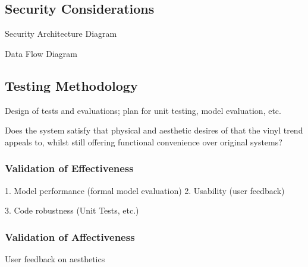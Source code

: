         \subsection{Security Considerations} \label{sec:security}
    
            \begin{temp}
                Security Architecture Diagram
            \end{temp}
    
            \begin{temp}
                Data Flow Diagram
            \end{temp}
        
        \subsection{Testing Methodology}
    
            \begin{temp}
                Design of tests and evaluations; plan for unit testing, model evaluation, etc.
                
                Does the system satisfy that physical and aesthetic desires of that the vinyl trend appeals to, whilst still offering functional convenience over original systems?
            \end{temp}
            
            \subsubsection{Validation of Effectiveness}
                \begin{temp}
                1. Model performance (formal model evaluation)
                2. Usability (user feedback)
                
                3. Code robustness (Unit Tests, etc.)
                \end{temp}
        
        \subsubsection{Validation of Affectiveness}
            \begin{temp}
                User feedback on aesthetics
            \end{temp}
    
